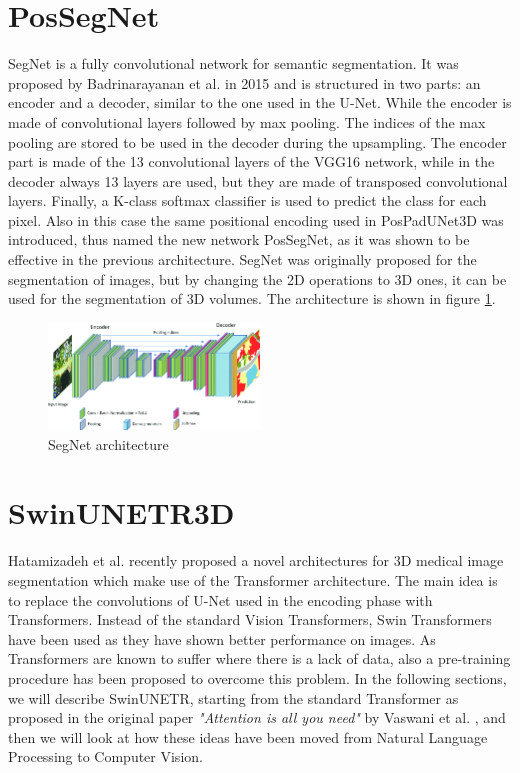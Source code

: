 \section{PosSegNet}
SegNet is a fully convolutional network for semantic segmentation. It was
proposed by Badrinarayanan et al. \cite{badrinarayanan2017segnet} in 2015 and is
structured in two parts: an encoder and a decoder, similar to the one used in
the U-Net. While the encoder is made of convolutional layers followed by max
pooling. The indices of the max pooling are stored to be used in the decoder
during the upsampling. The encoder part is made of the 13 convolutional layers
of the VGG16 network, while in the decoder always 13 layers are used, but they
are made of transposed convolutional layers. Finally, a K-class softmax
classifier is used to predict the class for each pixel.
Also in this case the same positional encoding used in PosPadUNet3D was
introduced, thus named the new network PosSegNet, as it was shown to be
effective in the previous architecture. SegNet was originally proposed for the
segmentation of images, but by changing the 2D operations to 3D ones, it can be
used for the segmentation of 3D volumes. The architecture is shown in figure
\ref{fig:segnet}.
\begin{figure}[h]
  \centering
  \includegraphics[width=0.5\textwidth]{Images/segnet.png}
  \caption{SegNet architecture}
  \label{fig:segnet}
\end{figure}

\section{SwinUNETR3D}
Hatamizadeh et al. \cite{hatamizadeh2022unetr,hatamizadeh2022swin} recently
proposed a novel architectures for 3D medical image segmentation which make use
of the Transformer architecture. The main idea is to replace the convolutions of
U-Net used in the encoding phase with Transformers. Instead of the standard
Vision Transformers, Swin Transformers have been used as they have shown better
performance on images. As Transformers are known to suffer where there is a lack
of data, also a pre-training procedure has been proposed \cite{tang2022self} to
overcome this problem. In the following sections, we will describe SwinUNETR,
starting from the standard Transformer as proposed in the original paper
\emph{"Attention is all you need"} by Vaswani et al.
\cite{vaswani2017attention}, and then we will look at how these ideas have been
moved from Natural Language Processing to Computer Vision.


